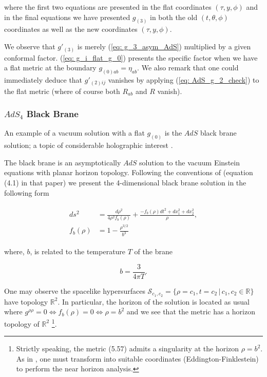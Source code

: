 \documentclass[a4paper,11pt]{article}
\numberwithin{equation}{section}
\begin{document}
\noindent where the first two equations are presented in the flat coordinates $(\tau, y, \phi)$ and in the final equations we have presented $g_{(3)}$ in both the old $(t, \theta, \phi)$ coordinates as well as the new coordinates $(\tau, y, \phi)$. \par

We observe that $g'_{(3)}$ is merely (\ref{eq: g_3_asym_AdS}) multiplied by a given conformal factor. (\ref{eq: g_i_flat_g_0}) presents the specific factor when we have a flat metric at the boundary $g_{(0) ab}=\eta_{ab}$. We also remark that one could immediately deduce that $g'_{(2)i j}$ vanishes by applying (\ref{eq: AdS_g_2_check}) to the flat metric (where of course both $R_{ab}$ and $R$ vanish). 

\subsubsection{$AdS_4$ Black Brane}

An example of a vacuum solution with a flat $g_{(0)}$ is the $AdS$ black brane solution; a topic of considerable holographic interest \cite{Bhattacharyya:2008jc, Gupta:2008th, Kanitscheider:2009as}. \par 

The black brane is an asymptotically $AdS$ solution to the vacuum Einstein equations with planar horizon topology. Following the conventions of \cite{Kanitscheider:2009as} (equation (4.1) in that paper) we present the 4-dimensional black brane solution in the following form 

\begin{align}
\begin{split}
ds^2&=\frac{d \rho^2}{4\rho^2 f_b(\rho)}+\frac{-f_b(\rho)dt^2+dx_1^2+dx_2^2}{\rho}, \\
f_b(\rho)&=1-\frac{\rho^{3/2}}{b^3}
\end{split} 
\end{align}

\noindent where, $b$, is related to the temperature $T$ of the brane

\begin{equation}
b=\frac{3}{4\pi T}.
\end{equation}

One may observe the spacelike hypersurfaces $\mathcal{S}_{c_1, c_2}=\{\rho=c_1, t=c_2 \, | \, c_1, c_2 \in \mathbb{R}\}$ have topology $\mathbb{R}^2$. In particular, the horizon of the solution is located as usual where $g^{\rho \rho}=0 \iff f_b(\rho)=0 \iff \rho=b^2$ and we see that the metric has a horizon topology of $\mathbb{R}^2$ \footnote{Strictly speaking, the metric (5.57) admits a singularity at the horizon $\rho=b^2$. As in \cite{Kanitscheider:2009as}, one must transform into suitable coordinates (Eddington-Finklestein) to perform the near horizon analysis.}. \par
\end{document}
